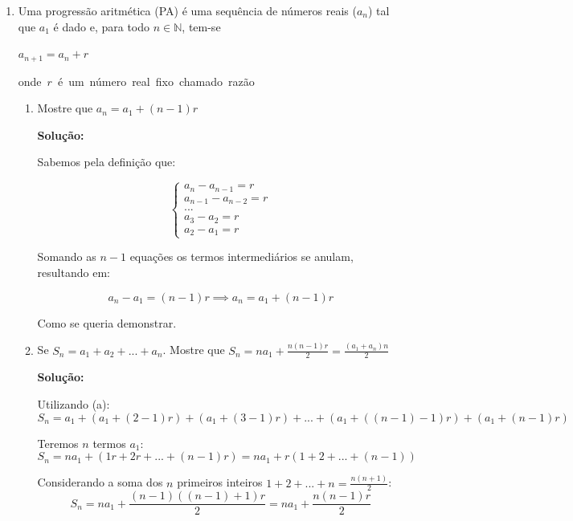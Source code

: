 \documentclass[
  12pt,
  openright,
  a4paper,
  twoside,
  english,
  brazil,
]{article}
\begin{document}
\begin{enumerate}[\bfseries  1.]
\begin{enumerate}[\bfseries (a)]
\begin{enumerate}[$1.$]
            Portanto $s(n)\in S$. E pelo Princípio da Indução Finita,
            é verdadeiro para todos os números naturais.

        \end{enumerate}

    \end{enumerate}

    \newpage

  \item Uma progressão aritmética (PA) é uma sequência de números reais
    ($a_n$) tal que $a_1$ é dado e, para todo $n\in\mathbb N$, tem-se

    {\center$a_{n+1}=a_n+r$\endcenter}

    \hbox{onde $r$ é um número real fixo chamado razão}

    \begin{enumerate}[\bfseries (a)]
      \item Mostre que $a_n=a_1+(n-1)r$

        \textbf{Solução:}

        Sabemos pela definição que:

        $$
        \begin{cases}
          a_{n}-a_{n-1}=r\\
          a_{n-1}-a_{n-2}=r\\
          ...\\
          a_3-a_2=r\\
          a_2-a_1=r
        \end{cases}
        $$

        Somando as $n-1$ equações os termos intermediários se anulam,
        resultando em:

        $$
        a_n-a_1=(n-1)r\implies a_n=a_1+(n-1)r
        $$

        Como se queria demonstrar.

      \item Se $S_n=a_1+a_2+...+a_n$. Mostre que
        $S_n=na_1+\frac{n(n-1)r}{2}=\frac{(a_1+a_n)n}{2}$

        \textbf{Solução:}

        Utilizando (a):
        $$
        S_n=a_1+(a_1+(2-1)r)+(a_1+(3-1)r)+...+(a_1+((n-1)-1)r)+(a_1+(n-1)r)
        $$

        Teremos $n$ termos $a_1$:
        $$
        S_n=na_1+(1r+2r+...+(n-1)r)=na_1+r(1+2+...+(n-1))
        $$

        Considerando a soma dos $n$ primeiros inteiros
        $1+2+...+n=\frac{n(n+1)}{2}$:
        $$
        S_n=na_1 +\frac{(n-1)((n-1)+1)r}{2}=na_1 +\frac{n(n-1)r}{2}
        $$


\end{enumerate}
\end{enumerate}
\end{document}
